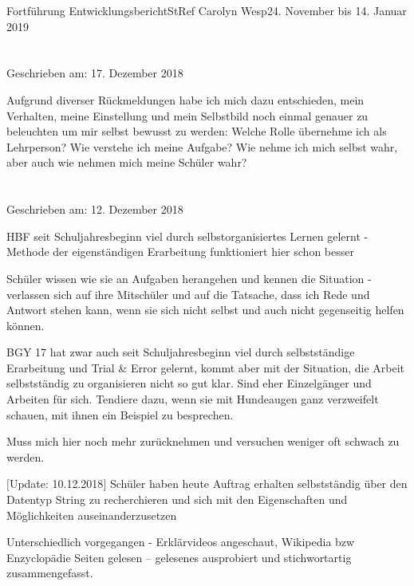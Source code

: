 \documentclass[oneside,openany,headings=optiontotoc,11pt,numbers=noenddot]{article}
\begin{document}
				
	\begin{worksheet}{Fortführung Entwicklungsbericht}{StRef\grq{} Carolyn Wesp}{24. November bis 14. Januar 2019}
		\section*{}
		\tiny{Geschrieben am: 17. Dezember 2018}\small\\
		\par\noindent
		Aufgrund diverser Rückmeldungen habe ich mich dazu entschieden, mein Verhalten, meine Einstellung und mein Selbstbild noch einmal genauer zu beleuchten um mir selbst bewusst zu werden: Welche Rolle übernehme ich als Lehrperson? Wie verstehe ich meine Aufgabe? Wie nehme ich mich selbst wahr, aber auch wie nehmen mich meine Schüler wahr?
		
		\section*{}
		\tiny{Geschrieben am: 12. Dezember 2018}\small\\
		\par\noindent
		HBF seit Schuljahresbeginn viel durch selbstorganisiertes Lernen gelernt - Methode der eigenständigen Erarbeitung funktioniert hier schon besser\\
		\par\noindent
		Schüler wissen wie sie an Aufgaben herangehen und kennen die Situation - verlassen sich auf ihre Mitschüler und auf die Tatsache, dass ich Rede und Antwort stehen kann, wenn sie sich nicht selbst und auch nicht gegenseitig helfen können.\\
		\par\noindent
		BGY 17 hat zwar auch seit Schuljahresbeginn viel durch selbstständige Erarbeitung und Trial \& Error gelernt, kommt aber mit der Situation, die Arbeit selbstständig zu organisieren nicht so gut klar. Sind eher Einzelgänger und Arbeiten für sich. Tendiere dazu, wenn sie mit Hundeaugen ganz verzweifelt schauen, mit ihnen ein Beispiel zu besprechen.\\
		\par\noindent		
		Muss mich hier noch mehr zurücknehmen und versuchen weniger oft schwach zu werden.\\
		\par\noindent		
		$\lbrack$Update: 10.12.2018$\rbrack$ Schüler haben heute Auftrag erhalten selbstständig über den Datentyp String zu recherchieren und sich mit den Eigenschaften und Möglichkeiten auseinanderzusetzen\\
		\par\noindent		
		Unterschiedlich vorgegangen - Erklärvideos angeschaut, Wikipedia bzw Enzyclopädie Seiten gelesen -- gelesenes ausprobiert und stichwortartig zusammengefasst.\\
		

\end{worksheet}
\end{document}
